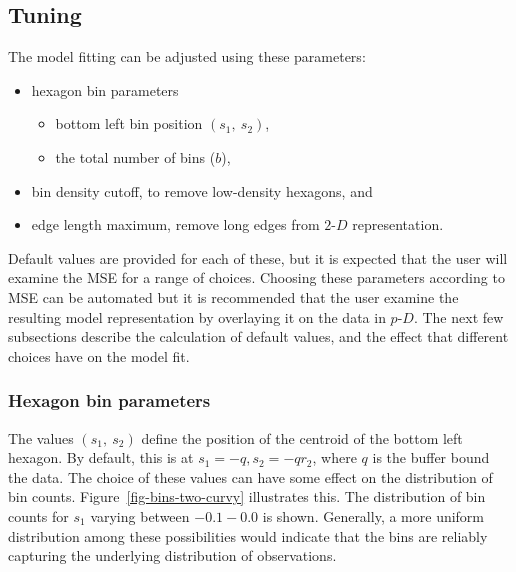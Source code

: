 \documentclass[
  12pt]{article}
\providecommand{\tightlist}{%
  \setlength{\itemsep}{0pt}\setlength{\parskip}{0pt}}\usepackage{longtable,booktabs,array}
\def\tightlist{}
\newcommand\pD{$p\text{-}D$}
\newcommand\gD{$2\text{-}D$}
\begin{document}
\subsection{Tuning}\label{tuning}

The model fitting can be adjusted using these parameters:

\begin{itemize}
\tightlist
\item
  hexagon bin parameters

  \begin{itemize}
  \tightlist
  \item
    bottom left bin position \((s_1, \ s_2)\),
  \item
    the total number of bins (\(b\)),
  \end{itemize}
\item
  bin density cutoff, to remove low-density hexagons, and
\item
  edge length maximum, remove long edges from \gD{} representation.
\end{itemize}

Default values are provided for each of these, but it is expected that
the user will examine the MSE for a range of choices. Choosing these
parameters according to MSE can be automated but it is recommended that
the user examine the resulting model representation by overlaying it on
the data in \pD{}. The next few subsections describe the calculation of
default values, and the effect that different choices have on the model
fit.

\subsubsection{Hexagon bin parameters}\label{hexagon-bin-parameters}

The values \((s_1, \ s_2)\) define the position of the centroid of the
bottom left hexagon. By default, this is at \(s_1 = -q, s_2 = -qr_2\),
where \(q\) is the buffer bound the data. The choice of these values can
have some effect on the distribution of bin counts.
Figure~\ref{fig-bins-two-curvy} illustrates this. The distribution of
bin counts for \(s_1\) varying between \(-0.1-0.0\) is shown. Generally,
a more uniform distribution among these possibilities would indicate
that the bins are reliably capturing the underlying distribution of
observations.
\end{document}
